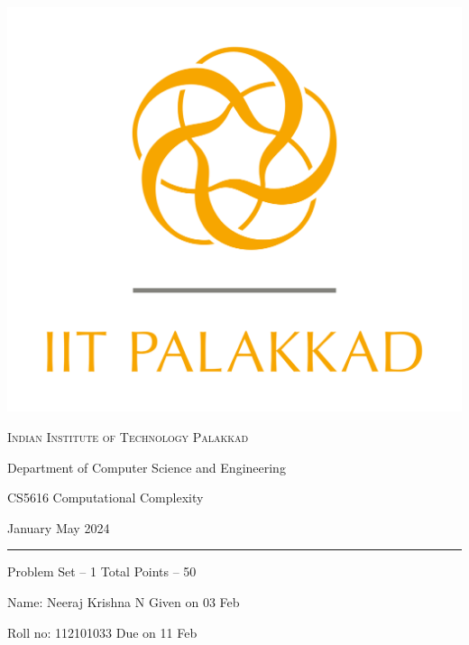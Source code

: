 \documentclass[11pt, a4paper,answers]{exam}
\begin{document}
	
	\noindent
	\begin{minipage}[l]{0.1\textwidth}
		\noindent
		\includegraphics[width=2.4\textwidth]{iitpkd}
	\end{minipage}
	\hfill
	\begin{minipage}[c]{0.8\textwidth}
		\begin{center}
			{\large \textsc{\textcolor{iitpkdcolor}{Indian Institute of Technology Palakkad}} \par
				\small	Department of Computer Science and Engineering	\par
				\large	CS5616 Computational Complexity \par 
				\small January May 2024}
		\end{center}
	\end{minipage}
	\par
	\vspace{2mm}
	\hrule
	\vspace{2mm}
	\begin{minipage}{0.9\textwidth} 
		\textsf{Problem Set} -- 1  \hfill  \textsf{Total Points} -- 50
		
		{\small \textsf{Name}: Neeraj Krishna N \hfill \small \textsf{Given on} 03 Feb}
		
		{\small \textsf{Roll no}: 112101033 \hfill \small \textsf{Due on} 11 Feb}
	\end{minipage}
	\vspace{0.2in}
	\noindent
	
\end{document}
